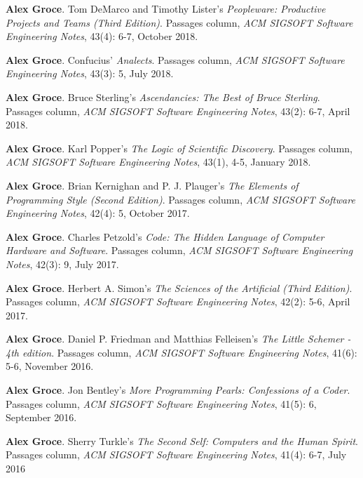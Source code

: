 \documentclass[ComputerScience]{vita}
\begin{document}
\begin{vita}
\begin{Columns, Book Reviews, and Magazine Articles}
\item {\bf Alex Groce}. 
\newblock Tom DeMarco and Timothy Lister's \emph{Peopleware: Productive Projects and Teams (Third Edition)}. 
\newblock Passages column, \emph{ACM SIGSOFT Software Engineering 
  Notes}, 43(4): 6-7, October 2018.

\item {\bf Alex Groce}. 
\newblock Confucius' \emph{Analects}. 
\newblock Passages column, \emph{ACM SIGSOFT Software Engineering 
  Notes}, 43(3): 5, July 2018.

\item {\bf Alex Groce}. 
\newblock Bruce Sterling's \emph{Ascendancies: The Best of Bruce Sterling}. 
\newblock Passages column, \emph{ACM SIGSOFT Software Engineering Notes}, 43(2): 6-7, April 2018.

\item {\bf Alex Groce}.
\newblock Karl Popper's \emph{The Logic of Scientific Discovery}.
\newblock Passages column, \emph{ACM SIGSOFT Software Engineering Notes}, 43(1), 4-5, January 2018.

\item {\bf Alex Groce}.
\newblock Brian Kernighan and P. J. Plauger's \emph{The Elements of Programming Style (Second Edition)}.
\newblock Passages column, \emph{ACM SIGSOFT Software Engineering Notes}, 42(4): 5, October 2017.

\item {\bf Alex Groce}.
\newblock Charles Petzold's \emph{Code: The Hidden Language of Computer Hardware and Software}.
\newblock Passages column, \emph{ACM SIGSOFT Software Engineering Notes}, 42(3): 9, July 2017.


\item {\bf Alex Groce}.
\newblock Herbert A. Simon's \emph{The Sciences of the Artificial (Third Edition)}.
\newblock Passages column, \emph{ACM SIGSOFT Software Engineering Notes}, 42(2): 5-6, April 2017.

\item {\bf Alex Groce}.
\newblock Daniel P. Friedman and Matthias Felleisen's \emph{The Little Schemer - 4th edition}.
\newblock Passages column, \emph{ACM SIGSOFT Software Engineering Notes}, 41(6): 5-6, November 2016.

\item {\bf Alex Groce}.
\newblock Jon Bentley's \emph{More Programming Pearls: Confessions of a Coder}.
\newblock Passages column, \emph{ACM SIGSOFT Software Engineering Notes}, 41(5): 6, September 2016.

\item {\bf Alex Groce}.
\newblock Sherry Turkle's \emph{The Second Self: Computers and the Human Spirit}.
\newblock Passages column, \emph{ACM SIGSOFT Software Engineering Notes}, 41(4): 6-7, July 2016


\end{Columns, Book Reviews, and Magazine Articles}
\end{vita}
\end{document}
